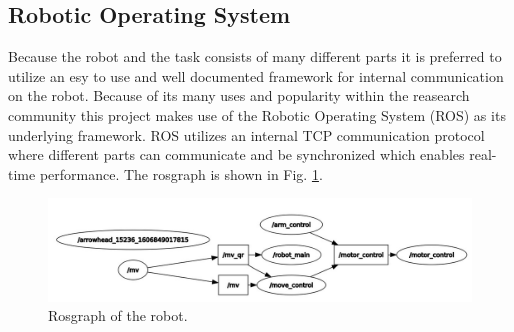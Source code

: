 \subsection{Robotic Operating System}
Because the robot and the task consists of many different parts it is preferred to utilize an esy to use and well documented framework for internal communication on the robot. Because of its many uses and popularity within the reasearch community this project makes use of the Robotic Operating System (ROS) as its underlying framework. 
ROS utilizes an internal TCP communication protocol where different parts can communicate and be synchronized which enables real-time performance. 
The rosgraph is shown in Fig. \ref{fig:rosgraph}. 

\begin{figure}
    \centering
    \includegraphics[width=0.7\columnwidth]{img/rosgraph.jpg}
    \caption{Rosgraph of the robot.}
    \label{fig:rosgraph}
\end{figure}



